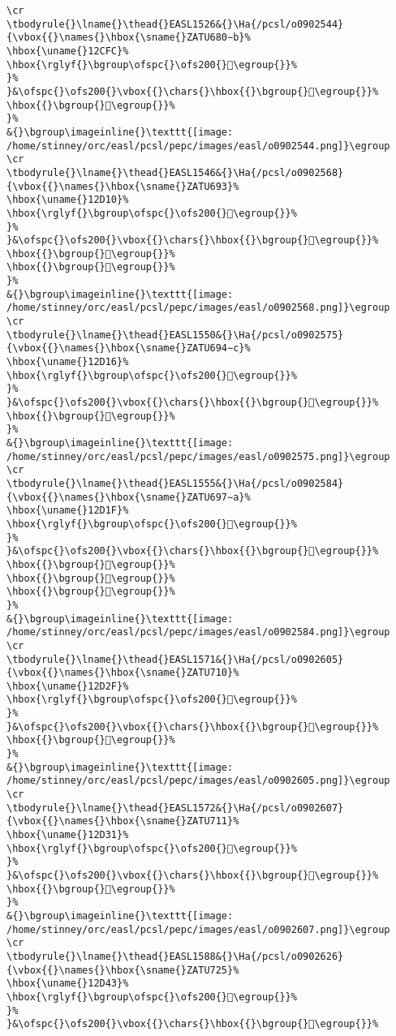 \begin{verbatim}
\cr
\tbodyrule{}\lname{}\thead{}EASL1526&{}\Ha{/pcsl/o0902544}{\vbox{{}\names{}\hbox{\sname{}ZATU680∼b}%
\hbox{\uname{}12CFC}%
\hbox{\rglyf{}\bgroup\ofspc{}\ofs200{}𒳼\egroup{}}%
}%
}&\ofspc{}\ofs200{}\vbox{{}\chars{}\hbox{{}\bgroup{}𒳻\egroup{}}%
\hbox{{}\bgroup{}𒳼\egroup{}}%
}%
&{}\bgroup\imageinline{}\texttt{[image: /home/stinney/orc/easl/pcsl/pepc/images/easl/o0902544.png]}\egroup
\cr
\tbodyrule{}\lname{}\thead{}EASL1546&{}\Ha{/pcsl/o0902568}{\vbox{{}\names{}\hbox{\sname{}ZATU693}%
\hbox{\uname{}12D10}%
\hbox{\rglyf{}\bgroup\ofspc{}\ofs200{}𒴐\egroup{}}%
}%
}&\ofspc{}\ofs200{}\vbox{{}\chars{}\hbox{{}\bgroup{}𒴐\egroup{}}%
\hbox{{}\bgroup{}𒴒\egroup{}}%
\hbox{{}\bgroup{}𒴓\egroup{}}%
}%
&{}\bgroup\imageinline{}\texttt{[image: /home/stinney/orc/easl/pcsl/pepc/images/easl/o0902568.png]}\egroup
\cr
\tbodyrule{}\lname{}\thead{}EASL1550&{}\Ha{/pcsl/o0902575}{\vbox{{}\names{}\hbox{\sname{}ZATU694∼c}%
\hbox{\uname{}12D16}%
\hbox{\rglyf{}\bgroup\ofspc{}\ofs200{}𒴖\egroup{}}%
}%
}&\ofspc{}\ofs200{}\vbox{{}\chars{}\hbox{{}\bgroup{}𒴖\egroup{}}%
\hbox{{}\bgroup{}𒴗\egroup{}}%
}%
&{}\bgroup\imageinline{}\texttt{[image: /home/stinney/orc/easl/pcsl/pepc/images/easl/o0902575.png]}\egroup
\cr
\tbodyrule{}\lname{}\thead{}EASL1555&{}\Ha{/pcsl/o0902584}{\vbox{{}\names{}\hbox{\sname{}ZATU697∼a}%
\hbox{\uname{}12D1F}%
\hbox{\rglyf{}\bgroup\ofspc{}\ofs200{}𒴟\egroup{}}%
}%
}&\ofspc{}\ofs200{}\vbox{{}\chars{}\hbox{{}\bgroup{}𒴜\egroup{}}%
\hbox{{}\bgroup{}𒴝\egroup{}}%
\hbox{{}\bgroup{}𒴞\egroup{}}%
\hbox{{}\bgroup{}𒴟\egroup{}}%
}%
&{}\bgroup\imageinline{}\texttt{[image: /home/stinney/orc/easl/pcsl/pepc/images/easl/o0902584.png]}\egroup
\cr
\tbodyrule{}\lname{}\thead{}EASL1571&{}\Ha{/pcsl/o0902605}{\vbox{{}\names{}\hbox{\sname{}ZATU710}%
\hbox{\uname{}12D2F}%
\hbox{\rglyf{}\bgroup\ofspc{}\ofs200{}𒴯\egroup{}}%
}%
}&\ofspc{}\ofs200{}\vbox{{}\chars{}\hbox{{}\bgroup{}𒴯\egroup{}}%
\hbox{{}\bgroup{}𒴰\egroup{}}%
}%
&{}\bgroup\imageinline{}\texttt{[image: /home/stinney/orc/easl/pcsl/pepc/images/easl/o0902605.png]}\egroup
\cr
\tbodyrule{}\lname{}\thead{}EASL1572&{}\Ha{/pcsl/o0902607}{\vbox{{}\names{}\hbox{\sname{}ZATU711}%
\hbox{\uname{}12D31}%
\hbox{\rglyf{}\bgroup\ofspc{}\ofs200{}𒴱\egroup{}}%
}%
}&\ofspc{}\ofs200{}\vbox{{}\chars{}\hbox{{}\bgroup{}𒴲\egroup{}}%
\hbox{{}\bgroup{}𒴱\egroup{}}%
}%
&{}\bgroup\imageinline{}\texttt{[image: /home/stinney/orc/easl/pcsl/pepc/images/easl/o0902607.png]}\egroup
\cr
\tbodyrule{}\lname{}\thead{}EASL1588&{}\Ha{/pcsl/o0902626}{\vbox{{}\names{}\hbox{\sname{}ZATU725}%
\hbox{\uname{}12D43}%
\hbox{\rglyf{}\bgroup\ofspc{}\ofs200{}𒵃\egroup{}}%
}%
}&\ofspc{}\ofs200{}\vbox{{}\chars{}\hbox{{}\bgroup{}𒵂\egroup{}}%

\end{verbatim}
